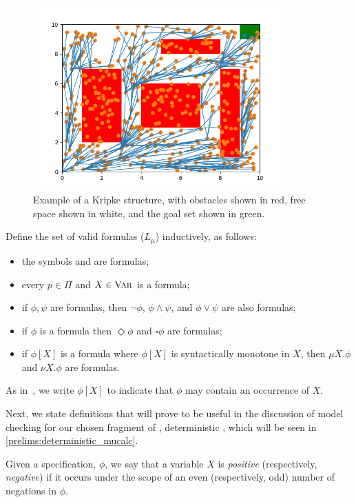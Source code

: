 \begin{figure}[!ht]
    \begin{center}
        \includegraphics[width=0.85\textwidth]{./figures/kripke_example}
    \end{center}
    \caption[Example of a Kripke structure]{Example of a Kripke structure, with obstacles shown in red, free space shown in white, and the goal set shown in green.}
\label{fig:kripke}
\end{figure}


\noindent Define the set of valid \mucalc{} formulas ($L_\mu$) inductively, as follows:
\begin{itemize}
    \item the symbols \true{} and \false{} are formulas;
    \item every $p \in \Pi$ and $X \in \textsc{Var}$ is a formula;
    \item if $\phi,\psi$ are formulas, then $\lnot \phi$, $\phi \land \psi$, and $\phi \lor \psi$ are also formulas;
    \item if $\phi$ is a formula then $\Diamond \phi$ and $\square \phi$ are formulas;
    \item if $\phi[X]$ is a formula where $\phi[X]$ is syntactically monotone in $X$, then $\mu X.\phi$ and $\nu X.\phi$ are formulas.
\end{itemize}
As in~\cite{Gurfinkel2004}, we write $\phi[X]$ to indicate that $\phi$ may contain an occurrence of $X$.

Next, we state definitions that will prove to be useful in the discussion of model checking for our chosen fragment of \mucalc{}, deterministic \mucalc{}, which will be seen in \autoref{prelims:deterministic_mucalc}.

\begin{defn}
    Given a \mucalc{} specification, $\phi$, we say that a variable $X$ is {\em positive\/} (respectively, {\em negative\/}) if it occurs under the scope of an even (respectively, odd) number of negations in $\phi$.
\end{defn}

